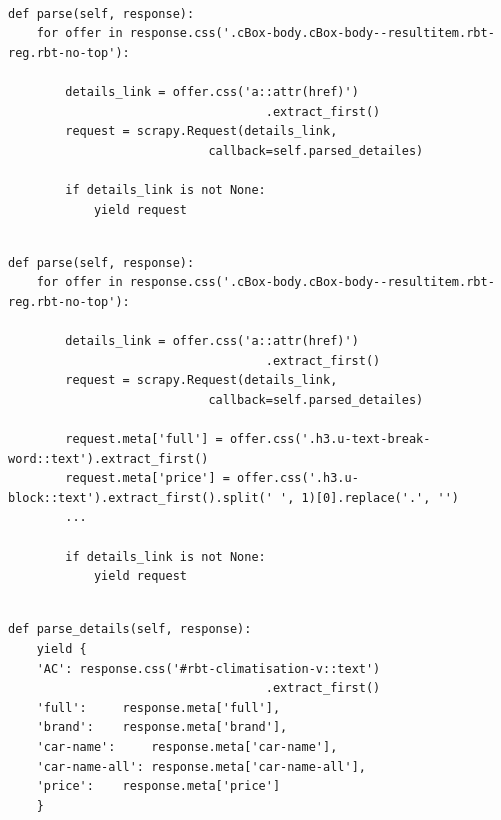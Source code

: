 \documentclass{beamer}
\begin{document}
\begin{frame}
\begin{lstlisting}
        \end{lstlisting}
        
	\framebreak
	
	
		\begin{lstlisting}
     
def parse(self, response):
    for offer in response.css('.cBox-body.cBox-body--resultitem.rbt-reg.rbt-no-top'): 
            
        details_link = offer.css('a::attr(href)')
                                    .extract_first()
        request = scrapy.Request(details_link,
                            callback=self.parsed_detailes)
            
        if details_link is not None:
            yield request
            
        \end{lstlisting}
        
	\framebreak
	
	
		\begin{lstlisting}
def parse(self, response):
    for offer in response.css('.cBox-body.cBox-body--resultitem.rbt-reg.rbt-no-top'): 
            
        details_link = offer.css('a::attr(href)')
                                    .extract_first()
        request = scrapy.Request(details_link,
                            callback=self.parsed_detailes)

        request.meta['full'] = offer.css('.h3.u-text-break-word::text').extract_first()
        request.meta['price'] = offer.css('.h3.u-block::text').extract_first().split(' ', 1)[0].replace('.', '')
        ...
        
        if details_link is not None:
            yield request
            
        \end{lstlisting}
        
	\framebreak
	

		\begin{lstlisting}
def parse_details(self, response):
    yield {
    'AC': response.css('#rbt-climatisation-v::text')
                                    .extract_first()
    'full':     response.meta['full'],
    'brand':    response.meta['brand'],
    'car-name':     response.meta['car-name'],
    'car-name-all': response.meta['car-name-all'],
    'price':    response.meta['price']
    }
     

\end{lstlisting}
\end{frame}
\end{document}
